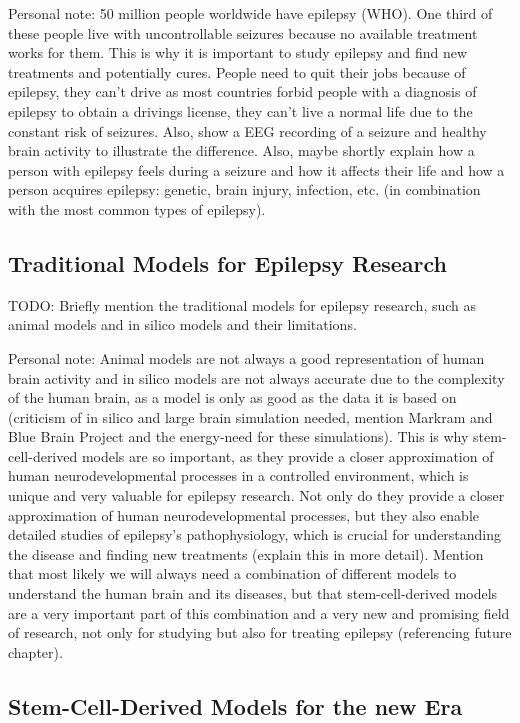 \documentclass[10pt]{article}
\begin{document}
\begin{sloppypar}
  Personal note: 50 million people worldwide have epilepsy (WHO). One third of these people live with uncontrollable seizures because no available treatment works for them. This is why it is important to study epilepsy and find new treatments and potentially cures. People need to quit their jobs because of epilepsy, they can't drive as most countries forbid people with a diagnosis of epilepsy to obtain a drivings license, they can't live a normal life due to the constant risk of seizures. Also, show a EEG recording of a seizure and healthy brain activity to illustrate the difference. Also, maybe shortly explain how a person with epilepsy feels during a seizure and how it affects their life and how a person acquires epilepsy: genetic, brain injury, infection, etc. (in combination with the most common types of epilepsy).

  \subsection{Traditional Models for Epilepsy Research}
  \label{sec:traditional-models-for-epilepsy-research}
  TODO: Briefly mention the traditional models for epilepsy research, such as animal models and in silico models and their limitations.

  Personal note: Animal models are not always a good representation of human brain activity and in silico models are not always accurate due to the complexity of the human brain, as a model is only as good as the data it is based on (criticism of in silico and large brain simulation needed, mention Markram and Blue Brain Project and the energy-need for these simulations). This is why stem-cell-derived models are so important, as they provide a closer approximation of human neurodevelopmental processes in a controlled environment, which is unique and very valuable for epilepsy research. Not only do they provide a closer approximation of human neurodevelopmental processes, but they also enable detailed studies of epilepsy's pathophysiology, which is crucial for understanding the disease and finding new treatments (explain this in more detail). Mention that most likely we will always need a combination of different models to understand the human brain and its diseases, but that stem-cell-derived models are a very important part of this combination and a very new and promising field of research, not only for studying but also for treating epilepsy (referencing future chapter).

  \subsection{Stem-Cell-Derived Models for the new Era}
  \label{sec:stem-cell-derived-models-for-the-new-era}


\end{sloppypar}
\end{document}

